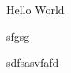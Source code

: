 \documentclass[a4paper, 12pt]{article}
\begin{document}
    \fontsize{14pt}{20pt}\selectfont
    Hello World

    sfgsg

    sdfsasvfafd
    
    
    
\end{document}
